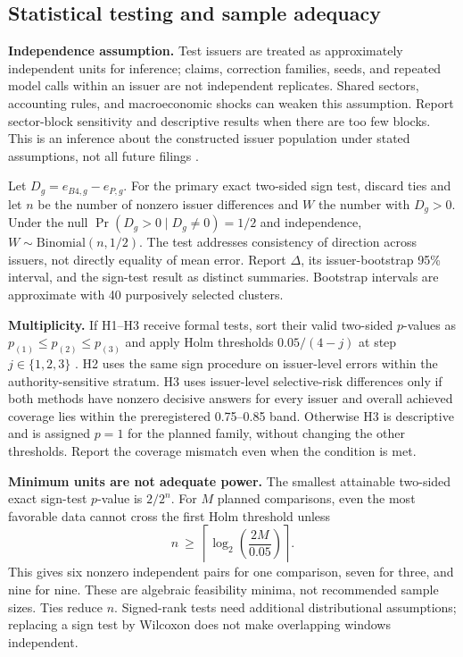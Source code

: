 \documentclass[11pt,a4paper]{article}
\newcommand{\pbreak}{\clearpage}
\newcommand{\lead}[1]{\textbf{\color{navy}#1}}
\begin{document}
\pbreak
\subsection{Statistical testing and sample adequacy}
\lead{Independence assumption.} Test issuers are treated as approximately independent units for inference; claims, correction families, seeds, and repeated model calls within an issuer are not independent replicates. Shared sectors, accounting rules, and macroeconomic shocks can weaken this assumption. Report sector-block sensitivity and descriptive results when there are too few blocks. This is an inference about the constructed issuer population under stated assumptions, not all future filings \cite{demsar}.

Let $D_g=e_{B4,g}-e_{P,g}$. For the primary exact two-sided sign test, discard ties and let $n$ be the number of nonzero issuer differences and $W$ the number with $D_g>0$. Under the null $\Pr(D_g>0\mid D_g\ne0)=1/2$ and independence, $W\sim\mathrm{Binomial}(n,1/2)$. The test addresses consistency of direction across issuers, not directly equality of mean error. Report $\Delta$, its issuer-bootstrap 95\% interval, and the sign-test result as distinct summaries. Bootstrap intervals are approximate with 40 purposively selected clusters.

\lead{Multiplicity.} If H1--H3 receive formal tests, sort their valid two-sided $p$-values as $p_{(1)}\le p_{(2)}\le p_{(3)}$ and apply Holm thresholds $0.05/(4-j)$ at step $j\in\{1,2,3\}$ \cite{holm}. H2 uses the same sign procedure on issuer-level errors within the authority-sensitive stratum. H3 uses issuer-level selective-risk differences only if both methods have nonzero decisive answers for every issuer and overall achieved coverage lies within the preregistered 0.75--0.85 band. Otherwise H3 is descriptive and is assigned $p=1$ for the planned family, without changing the other thresholds. Report the coverage mismatch even when the condition is met.

\lead{Minimum units are not adequate power.} The smallest attainable two-sided exact sign-test $p$-value is $2/2^n$. For $M$ planned comparisons, even the most favorable data cannot cross the first Holm threshold unless
\[
n\ \ge\ \left\lceil\log_2\left(\frac{2M}{0.05}\right)\right\rceil.
\]
This gives six nonzero independent pairs for one comparison, seven for three, and nine for nine. These are algebraic feasibility minima, not recommended sample sizes. Ties reduce $n$. Signed-rank tests need additional distributional assumptions; replacing a sign test by Wilcoxon does not make overlapping windows independent.
\end{document}
